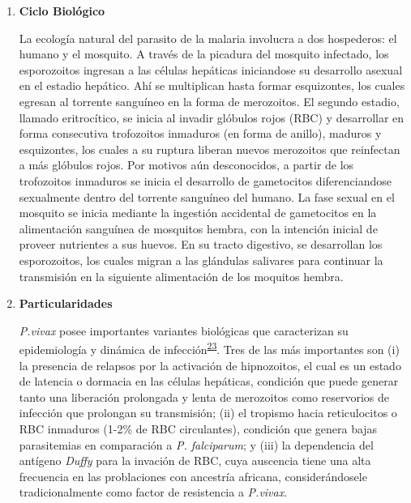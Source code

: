 \documentclass[]{article}
\begin{document}
\begin{enumerate}
  \begin{enumerate}
  \def\labelenumii{\roman{enumii}.}
  \item
    \textbf{Ciclo Biológico}

    La ecología natural del parasito de la malaria involucra a dos
    hospederos: el humano y el mosquito. A través de la picadura del
    mosquito infectado, los esporozoitos ingresan a las células
    hepáticas iniciandose su desarrollo asexual en el estadio hepático.
    Ahí se multiplican hasta formar esquizontes, los cuales egresan al
    torrente sanguíneo en la forma de merozoitos. El segundo estadio,
    llamado eritrocítico, se inicia al invadir glóbulos rojos (RBC) y
    desarrollar en forma consecutiva trofozoitos inmaduros (en forma de
    anillo), maduros y esquizontes, los cuales a su ruptura liberan
    nuevos merozoitos que reinfectan a más glóbulos rojos. Por motivos
    aún desconocidos, a partir de los trofozoitos inmaduros se inicia el
    desarrollo de gametocitos diferenciandose sexualmente dentro del
    torrente sanguíneo del humano. La fase sexual en el mosquito se
    inicia mediante la ingestión accidental de gametocitos en la
    alimentación sanguínea de mosquitos hembra, con la intención inicial
    de proveer nutrientes a sus huevos. En su tracto digestivo, se
    desarrollan los esporozoitos, los cuales migran a las glándulas
    salivares para continuar la transmisión en la siguiente alimentación
    de los moquitos hembra.
  \item
    \textbf{Particularidades}

    \emph{P.vivax} posee importantes variantes biológicas que
    caracterizan su epidemiología y dinámica de
    infección\textsuperscript{\protect\hyperlink{ref-howes2016global}{23}}.
    Tres de las más importantes son (i) la presencia de relapsos por la
    activación de hipnozoitos, el cual es un estado de latencia o
    dormacia en las células hepáticas, condición que puede generar tanto
    una liberación prolongada y lenta de merozoitos como reservorios de
    infección que prolongan su transmisión; (ii) el tropismo hacia
    reticulocitos o RBC inmaduros (1-2\% de RBC circulantes), condición
    que genera bajas parasitemias en comparación a \emph{P. falciparum};
    y (iii) la dependencia del antígeno \emph{Duffy} para la invación de
    RBC, cuya auscencia tiene una alta frecuencia en las problaciones
    con ancestría africana, considerándosele tradicionalmente como
    factor de resistencia a \emph{P.vivax}.
  \end{enumerate}
\end{enumerate}
\end{document}
